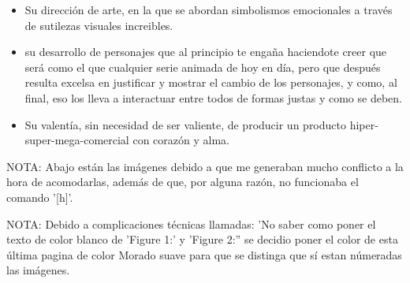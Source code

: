 \documentclass[11pt,A5]{article}
\begin{document}
\begin{itemize}
    \item Su dirección de arte, en la que se abordan simbolismos emocionales a través de sutilezas visuales increibles.
    \item su desarrollo de personajes que al principio te engaña haciendote creer que será como el que cualquier serie animada de hoy en día, pero que después resulta excelsa en justificar y mostrar el cambio de los personajes, y como, al final, eso los lleva a interactuar entre todos de formas justas y como se deben.
    \item Su valentía, sin necesidad de ser valiente, de producir un producto hiper-super-mega-comercial con corazón y alma.
\end{itemize}

NOTA: Abajo están las imágenes debido a que me generaban mucho conflicto a la hora de acomodarlas, además de que, por alguna razón, no funcionaba el comando '[h]'.

\newpage

\pagecolor{moradu}

NOTA: Debido a complicaciones técnicas llamadas: 'No saber como poner el texto de color blanco de 'Figure 1:' y 'Figure 2:'' se decidio poner el color de esta última pagina de color Morado suave para que se distinga que sí estan númeradas las imágenes.\newline
\end{document}
